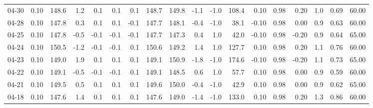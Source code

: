 \begin{threeparttable}
{\begin{tabular}{lrrrrrrrrrrrrrrrrr}
  04-30 &     0.10 & 148.6 &               1.2 &               0.1 &                0.1 &                0.1 & 148.7 & 149.8 &       -1.1 &                     -1.0 &               108.4 &       0.10 &      0.98 &           0.20 &              1.0 &            0.69 &                  60.00 \\
  04-28 &     0.10 & 147.8 &               0.3 &               0.1 &                0.1 &               -0.1 & 147.7 & 148.1 &       -0.4 &                     -1.0 &                38.1 &      -0.10 &      0.98 &           0.00 &              0.9 &            0.63 &                  60.00 \\
  04-25 &     0.10 & 147.8 &              -0.5 &              -0.1 &               -0.1 &               -0.1 & 147.7 & 147.3 &        0.4 &                      1.0 &                42.0 &      -0.10 &      0.98 &          -0.20 &              0.9 &            0.64 &                  65.00 \\
  04-24 &     0.10 & 150.5 &              -1.2 &              -0.1 &               -0.1 &                0.1 & 150.6 & 149.2 &        1.4 &                      1.0 &               127.7 &       0.10 &      0.98 &           0.20 &              1.1 &            0.76 &                  60.00 \\
  04-23 &     0.10 & 149.0 &               1.9 &               0.1 &                0.1 &                0.1 & 149.1 & 150.9 &       -1.8 &                     -1.0 &               174.6 &      -0.10 &      0.98 &          -0.20 &              1.1 &            0.73 &                  65.00 \\
  04-22 &     0.10 & 149.1 &              -0.5 &              -0.1 &               -0.1 &                0.1 & 149.1 & 148.5 &        0.6 &                      1.0 &                57.7 &       0.10 &      0.98 &           0.00 &              0.9 &            0.59 &                  60.00 \\
  04-21 &     0.10 & 149.5 &               0.5 &               0.1 &                0.1 &                0.1 & 149.6 & 150.0 &       -0.4 &                     -1.0 &                42.9 &       0.10 &      0.98 &           0.00 &              0.9 &            0.62 &                  65.00 \\
  04-18 &     0.10 & 147.6 &               1.4 &               0.1 &                0.1 &                0.1 & 147.6 & 149.0 &       -1.4 &                     -1.0 &               133.0 &       0.10 &      0.98 &           0.20 &              1.3 &            0.86 &                  60.00 \\

\end{tabular}}
\end{threeparttable}
